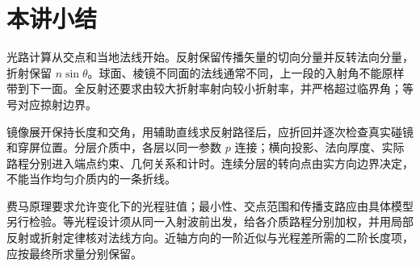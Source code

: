 \section{本讲小结}

光路计算从交点和当地法线开始。反射保留传播矢量的切向分量并反转法向分量，折射保留 $n\sin\theta$。球面、棱镜不同面的法线通常不同，上一段的入射角不能原样带到下一面。全反射还要求由较大折射率射向较小折射率，并严格超过临界角；等号对应掠射边界。

镜像展开保持长度和交角，用辅助直线求反射路径后，应折回并逐次检查真实碰镜和穿屏位置。分层介质中，各层以同一参数 $p$ 连接；横向投影、法向厚度、实际路程分别进入端点约束、几何关系和计时。连续分层的转向点由实方向边界决定，不能当作均匀介质内的一条折线。

费马原理要求允许变化下的光程驻值；最小性、交点范围和传播支路应由具体模型另行检验。等光程设计须从同一入射波前出发，给各介质路程分别加权，并用局部反射或折射定律核对法线方向。近轴方向的一阶近似与光程差所需的二阶长度项，应按最终所求量分别保留。
